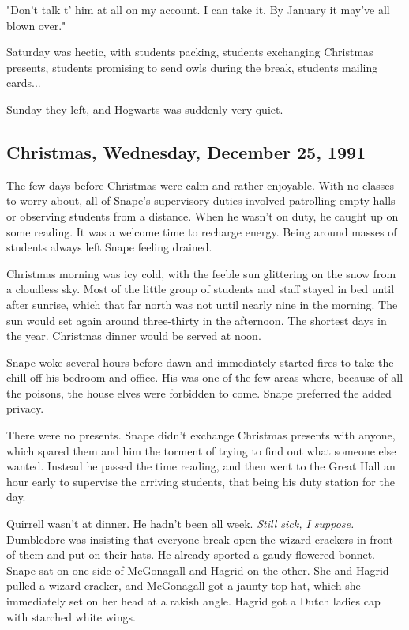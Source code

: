 "Don't talk t' him at all on my account. I can take it. By January it may've all blown over."

Saturday was hectic, with students packing, students exchanging Christmas presents, students promising to send owls during the break, students mailing cards...

Sunday they left, and Hogwarts was suddenly very quiet.

\subsection{Christmas, Wednesday, December 25, 1991}

The few days before Christmas were calm and rather enjoyable. With no classes to worry about, all of Snape's supervisory duties involved patrolling empty halls or observing students from a distance. When he wasn't on duty, he caught up on some reading. It was a welcome time to recharge energy. Being around masses of students always left Snape feeling drained.

Christmas morning was icy cold, with the feeble sun glittering on the snow from a cloudless sky. Most of the little group of students and staff stayed in bed until after sunrise, which that far north was not until nearly nine in the morning. The sun would set again around three-thirty in the afternoon. The shortest days in the year. Christmas dinner would be served at noon.

Snape woke several hours before dawn and immediately started fires to take the chill off his bedroom and office. His was one of the few areas where, because of all the poisons, the house elves were forbidden to come. Snape preferred the added privacy.

There were no presents. Snape didn't exchange Christmas presents with anyone, which spared them and him the torment of trying to find out what someone else wanted. Instead he passed the time reading, and then went to the Great Hall an hour early to supervise the arriving students, that being his duty station for the day.

Quirrell wasn't at dinner. He hadn't been all week. \emph{Still sick, I suppose.} Dumbledore was insisting that everyone break open the wizard crackers in front of them and put on their hats. He already sported a gaudy flowered bonnet. Snape sat on one side of McGonagall and Hagrid on the other. She and Hagrid pulled a wizard cracker, and McGonagall got a jaunty top hat, which she immediately set on her head at a rakish angle. Hagrid got a Dutch ladies cap with starched white wings.


